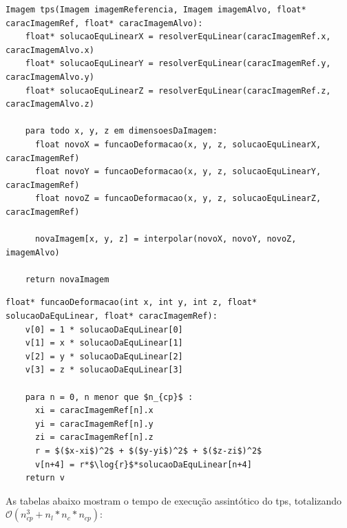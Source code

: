 \begin{minipage}{\linewidth}
  \begin{lstlisting}[mathescape]
  Imagem tps(Imagem imagemReferencia, Imagem imagemAlvo, float* caracImagemRef, float* caracImagemAlvo):
    float* solucaoEquLinearX = resolverEquLinear(caracImagemRef.x, caracImagemAlvo.x)
    float* solucaoEquLinearY = resolverEquLinear(caracImagemRef.y, caracImagemAlvo.y)
    float* solucaoEquLinearZ = resolverEquLinear(caracImagemRef.z, caracImagemAlvo.z)

    para todo x, y, z em dimensoesDaImagem:
      float novoX = funcaoDeformacao(x, y, z, solucaoEquLinearX, caracImagemRef)
      float novoY = funcaoDeformacao(x, y, z, solucaoEquLinearY, caracImagemRef)
      float novoZ = funcaoDeformacao(x, y, z, solucaoEquLinearZ, caracImagemRef)

      novaImagem[x, y, z] = interpolar(novoX, novoY, novoZ, imagemAlvo)

    return novaImagem
  \end{lstlisting}
\end{minipage}

\begin{minipage}{\linewidth}
  \begin{lstlisting}[mathescape]
  float* funcaoDeformacao(int x, int y, int z, float* solucaoDaEquLinear, float* caracImagemRef):
    v[0] = 1 * solucaoDaEquLinear[0]
    v[1] = x * solucaoDaEquLinear[1]
    v[2] = y * solucaoDaEquLinear[2]
    v[3] = z * solucaoDaEquLinear[3]

    para n = 0, n menor que $n_{cp}$ :
      xi = caracImagemRef[n].x
      yi = caracImagemRef[n].y
      zi = caracImagemRef[n].z
      r = $($x-xi$)^2$ + $($y-yi$)^2$ + $($z-zi$)^2$
      v[n+4] = r*$\log{r}$*solucaoDaEquLinear[n+4]
    return v
  \end{lstlisting}
\end{minipage}

  As tabelas abaixo mostram o tempo de execução assintótico do tps, totalizando
$\mathcal{O}(n_{cp}^3+n_l*n_c*n_{cp})$:

